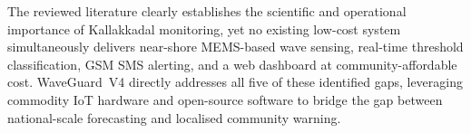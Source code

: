 \noindent The reviewed literature clearly establishes the scientific and operational
importance of Kallakkadal monitoring, yet no existing low-cost system simultaneously
delivers near-shore MEMS-based wave sensing, real-time threshold classification,
GSM SMS alerting, and a web dashboard at community-affordable cost.
WaveGuard~V4 directly addresses all five of these identified gaps, leveraging commodity
IoT hardware and open-source software to bridge the gap between national-scale
forecasting and localised community warning.
